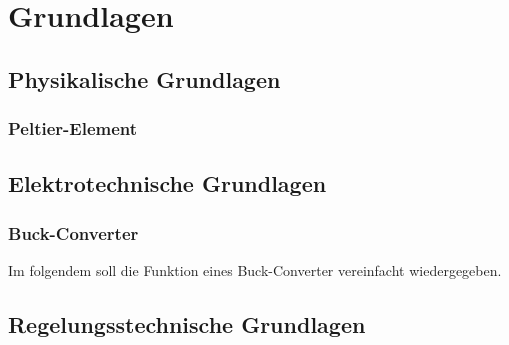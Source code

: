 \chapter{Grundlagen}
\section{Physikalische Grundlagen} 
\subsection{Peltier-Element}
\section{Elektrotechnische Grundlagen}
\subsection{Buck-Converter}
Im folgendem soll die Funktion eines Buck-Converter vereinfacht wiedergegeben.


\section{Regelungsstechnische Grundlagen}
